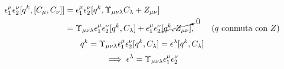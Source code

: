 \begin{prueba}
\begin{align}
  \epsilon_1^\mu \epsilon_2^\nu [q^k,[C_\mu,C_\nu ]]&=\epsilon_1^\mu \epsilon_2^\nu[q^k, \Upsilon_{\mu\nu\lambda}C_\lambda+Z_{\mu\nu }]\\
  &=\Upsilon_{\mu\nu\lambda}\epsilon_1^\mu \epsilon_2^\nu[q^k,C_\lambda]+\epsilon_1^\mu \epsilon_2^\nu\cancelto{0}{[q^k,Z_{\mu\nu }]},\qquad \text{($q$ conmuta con $Z$)}
\end{align}
\begin{equation}
  [\db_2,\db_1]q^k=\Upsilon_{\m\n\lambda}\epsilon_1^\m \epsilon_2^\n[q^k,C_\lambda]=\epsilon^\lambda[q^k,C_\lambda]
\end{equation}
\begin{equation}
  \implies \epsilon^\lambda=\Upsilon_{\mu\nu\lambda }\epsilon_1^\mu \epsilon_2^\nu
\end{equation}
\end{prueba}



























































